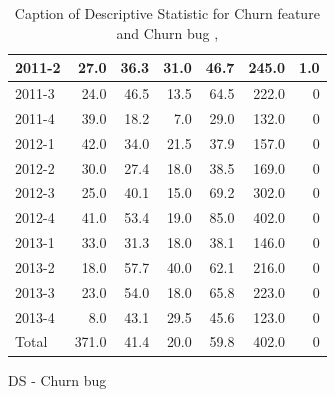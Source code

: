 \documentclass[UKenglish]{ifimaster}  %
\begin{document}
\begin{appendices}
\begin{table}[!htbp]
\begin{adjustwidth}{-1.5cm}{}
\begin{subfigure}[b]{0.7\textwidth}
{\begin{tabular}{ | l | r | r | r | r | r | r | }
2011-2 & 27.0 & 36.3 & 31.0 & 46.7 & 245.0 & 1.0\\ \hline
2011-3 & 24.0 & 46.5 & 13.5 & 64.5 & 222.0 & 0\\ \hline
2011-4 & 39.0 & 18.2 & 7.0 & 29.0 & 132.0 & 0\\ \hline
2012-1 & 42.0 & 34.0 & 21.5 & 37.9 & 157.0 & 0\\ \hline
2012-2 & 30.0 & 27.4 & 18.0 & 38.5 & 169.0 & 0\\ \hline
2012-3 & 25.0 & 40.1 & 15.0 & 69.2 & 302.0 & 0\\ \hline
2012-4 & 41.0 & 53.4 & 19.0 & 85.0 & 402.0 & 0\\ \hline
2013-1 & 33.0 & 31.3 & 18.0 & 38.1 & 146.0 & 0\\ \hline
2013-2 & 18.0 & 57.7 & 40.0 & 62.1 & 216.0 & 0\\ \hline
2013-3 & 23.0 & 54.0 & 18.0 & 65.8 & 223.0 & 0\\ \hline
2013-4 & 8.0 & 43.1 & 29.5 & 45.6 & 123.0 & 0\\ \hline
Total & 371.0 & 41.4 & 20.0 & 59.8 & 402.0 & 0\\ \hline\end{tabular}
}
\caption{DS - Churn bug}
 \label{DS:CB:3}
\end{subfigure}
\end{adjustwidth}
\caption[Optional caption for list of figures]{Caption of Descriptive Statistic for Churn feature and Churn bug , }
\label{DS:3:4}
\end{table}





\end{appendices}
\end{document}

